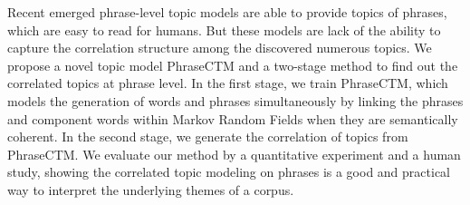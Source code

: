 Recent emerged phrase-level topic models are able to provide topics of phrases, which are easy to read for humans. But these models are lack of the ability to capture the correlation structure among the discovered numerous topics. We propose a novel topic model PhraseCTM and a two-stage method to find out the correlated topics at phrase level.  In the first stage, we train PhraseCTM, which models the generation of words and phrases simultaneously by linking the phrases and component words within Markov Random Fields when they are semantically coherent. In the second stage, we generate the correlation of topics from PhraseCTM. We evaluate our method by a quantitative experiment and a human study, showing the correlated topic modeling on phrases is a good and practical way to interpret the underlying themes of a corpus.
